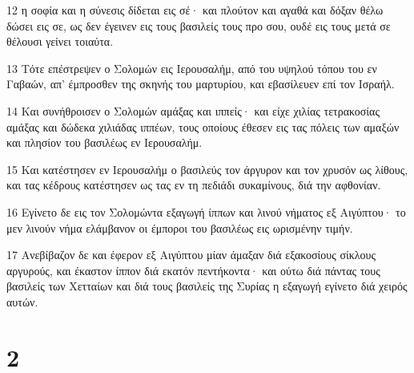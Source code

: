\par 12 η σοφία και η σύνεσις δίδεται εις σέ· και πλούτον και αγαθά και δόξαν θέλω δώσει εις σε, ως δεν έγεινεν εις τους βασιλείς τους προ σου, ουδέ εις τους μετά σε θέλουσι γείνει τοιαύτα.
\par 13 Τότε επέστρεψεν ο Σολομών εις Ιερουσαλήμ, από του υψηλού τόπου του εν Γαβαών, απ' έμπροσθεν της σκηνής του μαρτυρίου, και εβασίλευεν επί τον Ισραήλ.
\par 14 Και συνήθροισεν ο Σολομών αμάξας και ιππείς· και είχε χιλίας τετρακοσίας αμάξας και δώδεκα χιλιάδας ιππέων, τους οποίους έθεσεν εις τας πόλεις των αμαξών και πλησίον του βασιλέως εν Ιερουσαλήμ.
\par 15 Και κατέστησεν εν Ιερουσαλήμ ο βασιλεύς τον άργυρον και τον χρυσόν ως λίθους, και τας κέδρους κατέστησεν ως τας εν τη πεδιάδι συκαμίνους, διά την αφθονίαν.
\par 16 Εγίνετο δε εις τον Σολομώντα εξαγωγή ίππων και λινού νήματος εξ Αιγύπτου· το μεν λινούν νήμα ελάμβανον οι έμποροι του βασιλέως εις ωρισμένην τιμήν.
\par 17 Ανεβίβαζον δε και έφερον εξ Αιγύπτου μίαν άμαξαν διά εξακοσίους σίκλους αργυρούς, και έκαστον ίππον διά εκατόν πεντήκοντα· και ούτω διά πάντας τους βασιλείς των Χετταίων και διά τους βασιλείς της Συρίας η εξαγωγή εγίνετο διά χειρός αυτών.

\chapter{2}

